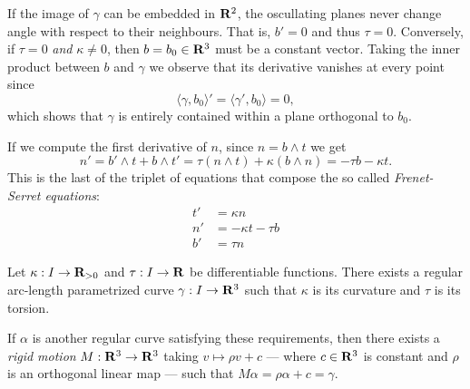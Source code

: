 \begin{definition}
\begin{enumerate}[(a)]
            If the image of \(\gamma\) can be embedded in \(\mathbf{R}^2\), the oscullating planes never
            change angle with respect to their neighbours. That is, \(b' = 0\) and thus \(\tau = 0\).
            Conversely, if \(\tau = 0\) \emph{and} \(\kappa \neq 0\), then \(b = b_0 \in \mathbf{R}^3\)
            must be a constant vector. Taking the inner product between \(b\) and \(\gamma\) we
            observe that its derivative vanishes at every point since
            \[
                \langle \gamma, b_0 \rangle' = \langle \gamma', b_0 \rangle = 0,
            \]
            which shows that \(\gamma\) is entirely contained within a plane orthogonal to \(b_0\).

            If we compute the first derivative of \(n\), since \(n = b \wedge t\) we get
            \[
                n' = b' \wedge t + b \wedge t'
                = \tau (n \wedge t) + \kappa (b \wedge n)
                = -\tau b - \kappa t.
            \]
            This is the last of the triplet of equations that compose the so called
            \emph{Frenet-Serret equations}:
            \begin{align}
                \label{eq:frenet-serret-diff-tangent}
                t' &= \kappa n \\
                \label{eq:frenet-serret-diff-normal}
                n' &= -\kappa t - \tau b \\
                \label{eq:frenet-serret-diff-binormal}
                b' &= \tau n
            \end{align}
    \end{enumerate}
\end{definition}

\begin{theorem}
    \label{thm:fundamental-thm-theory-local-curves}
    Let \(\kappa: I \to \mathbf{R}_{> 0}\) and \(\tau: I \to \mathbf{R}\) be differentiable functions. There exists
    a regular arc-length parametrized curve \(\gamma: I \to \mathbf{R}^3\) such that \(\kappa\) is its
    curvature and \(\tau\) is its torsion.

    If \(\alpha\) is another regular curve satisfying these requirements, then there exists a \emph{rigid
    motion} \(M: \mathbf{R}^3 \to \mathbf{R}^3\) taking \(v \mapsto \rho v + c\) --- where \(c \in \mathbf{R}^3\) is constant and
    \(\rho\) is an orthogonal linear map --- such that \(M \alpha = \rho \alpha + c = \gamma\).
\end{theorem}
